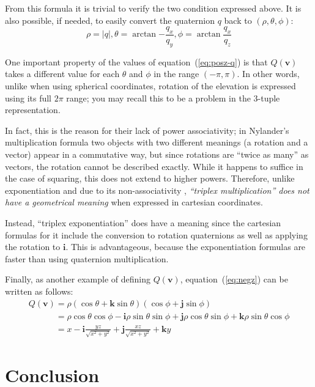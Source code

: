 \documentclass{article}
\let\vec\mathbf
\newcommand{\mathnewline}[1][\quad]{\\\phantom{#1}}
\begin{document}
\noindent
From this formula it is trivial to verify the two condition expressed
above.  It is also possible, if needed, to easily convert the
quaternion $q$ back to $(\rho, \theta, \phi)$:
\begin{equation*}
  \rho = |q|, \theta = \arctan {-\frac{q_x}{q_y}}, \phi = \arctan \frac{q_x}{q_z}
\end{equation*}

One important property of the values of equation~(\ref{eq:posz-q}) is
that $Q(\vec{v})$ takes a different value for each $\theta$ and $\phi$
in the range $(-\pi, \pi)$.  In other words, unlike when using
spherical coordinates, rotation of the elevation is expressed using
its full $2\pi$ range; you may recall this to be a problem in the
3-tuple representation.

In fact, this is the reason for their lack of power
associativity; in Nylander's multiplication formula two objects with
two different meanings (a rotation and a vector) appear in a
commutative way, but since rotations are ``twice as many'' as vectors,
the rotation cannot be described exactly.  While it happens to suffice
in the case of squaring, this does not extend to higher powers.
Therefore, unlike exponentiation and due to its non-associativity
, \emph{``triplex multiplication'' does not have a geometrical meaning}
when expressed in cartesian coordinates.

Instead, ``triplex exponentiation'' does have a meaning since the
cartesian formulas for it include the conversion to rotation
quaternions as well as applying the rotation to $\vec{i}$.  This is
advantageous, because the exponentiation
formulas are faster than using quaternion multiplication.

Finally, as another example of defining $Q(\vec{v})$,
equation~(\ref{eq:negz}) can be written as follows:
\begin{equation*}
  \begin{array}{l}
  Q(\vec{v}) = \rho (\cos \theta + \vec{k} \sin \theta) (\cos \phi + \vec{j} \sin \phi)
  \mathnewline[Q(\vec{v})] = \rho \cos \theta \cos \phi - \vec{i} \rho \sin \theta \sin \phi + \vec{j} \rho \cos \theta \sin \phi + \vec{k} \rho \sin \theta \cos \phi
  \mathnewline[Q(\vec{v})] = x - \vec{i}\frac{y z}{\sqrt{x^2 + y^2}} + \vec{j}\frac{x z}{\sqrt{x^2 + y^2}} + \vec{k} y
  \end{array}
\end{equation*}

\section{Conclusion}
\end{document}
